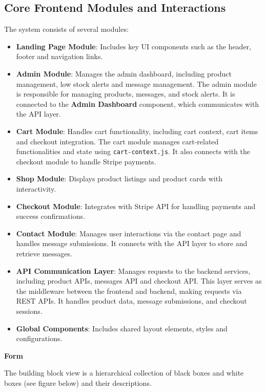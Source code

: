 \subsection{Core Frontend Modules and Interactions}
The system consists of several modules:
\begin{itemize}
    \item \textbf{Landing Page Module}: Includes key UI components such as the header, footer and navigation links.
    \item \textbf{Admin Module}: Manages the admin dashboard, including product management, low stock alerts and message management. The admin module is responsible for managing products, messages, and stock alerts. It is connected to the \textbf{Admin Dashboard} component, which communicates with the API layer.
    \item \textbf{Cart Module}: Handles cart functionality, including cart context, cart items and checkout integration. The cart module manages cart-related functionalities and state using \texttt{cart-context.js}. It also connects with the checkout module to handle Stripe payments.
    \item \textbf{Shop Module}: Displays product listings and product cards with interactivity.
    \item \textbf{Checkout Module}: Integrates with Stripe API for handling payments and success confirmations.
    \item \textbf{Contact Module}: Manages user interactions via the contact page and handles message submissions. It connects with the API layer to store and retrieve messages.
    \item \textbf{API Communication Layer}: Manages requests to the backend services, including product APIs, messages API and checkout API. This layer serves as the middleware between the frontend and backend, making requests via REST APIs. It handles product data, message submissions, and checkout sessions.
    \item \textbf{Global Components}: Includes shared layout elements, styles and configurations.
\end{itemize}


\textbf{Form}

The building block view is a hierarchical collection of black boxes and
white boxes (see figure below) and their descriptions.

